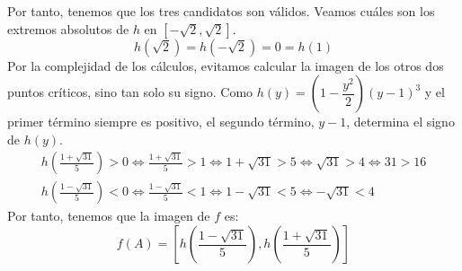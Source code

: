 \begin{ejercicio}
    Por tanto, tenemos que los tres candidatos son válidos. Veamos cuáles son los extremos absolutos de $h$ en $\left[-\sqrt{2},\sqrt{2}\right]$.
    \begin{equation*}
        h\left(\sqrt{2}\right) = h\left(-\sqrt{2}\right) = 0 = h(1)
    \end{equation*}
    Por la complejidad de los cálculos, evitamos calcular la imagen de los otros dos puntos críticos, sino tan solo su signo.
    Como $h(y)= \left(1-\dfrac{y^2}{2}\right)(y-1)^3$ y el primer término siempre es positivo, el segundo término, $y-1$, determina el signo de $h(y)$.
    \begin{gather*}
        h\left(\frac{1+\sqrt{31}}{5}\right) > 0 \Longleftrightarrow
        \frac{1+\sqrt{31}}{5} > 1 \Longleftrightarrow
        1+\sqrt{31} > 5 \Longleftrightarrow
        \sqrt{31} > 4 \Longleftrightarrow 31 > 16 \\
        h\left(\frac{1-\sqrt{31}}{5}\right) < 0 \Longleftrightarrow
        \frac{1-\sqrt{31}}{5} < 1 \Longleftrightarrow
        1-\sqrt{31} < 5 \Longleftrightarrow
        -\sqrt{31} < 4
    \end{gather*}
    Por tanto, tenemos que la imagen de $f$ es:
    \begin{equation*}
        f(A) = \left[h\left(\frac{1-\sqrt{31}}{5}\right), h\left(\frac{1+\sqrt{31}}{5}\right)\right]
    \end{equation*}
\end{ejercicio}

